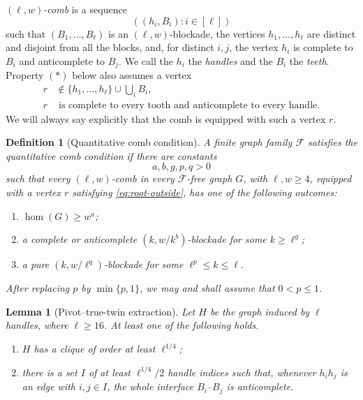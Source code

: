 \documentclass[10pt,a4paper]{amsart}
\newtheorem{definition}{Definition}
\newtheorem{lemma}{Lemma}
\begin{document}
\emph{$(\ell,w)$-comb} is a sequence
\[
                     ((h_i,B_i):i\in[\ell])
\]
such that $(B_1,\ldots,B_\ell)$ is an $(\ell,w)$-blockade, the
vertices $h_1,\ldots,h_\ell$ are distinct and disjoint from all the
blocks, and, for distinct $i,j$, the vertex $h_i$ is complete to
$B_i$ and anticomplete to $B_j$.  We call the $h_i$ the
\emph{handles} and the $B_i$ the \emph{teeth}.  Property $(*)$ below
also assumes a vertex
\begin{equation}
 \begin{split}
 r&\notin\{h_1,\ldots,h_\ell\}\cup\bigcup_iB_i,\\
 r&\text{ is complete to every tooth and anticomplete to every handle.}
 \end{split}
 \label{eq:root-outside}
\end{equation}
We will always say explicitly that the comb is equipped with such a
vertex $r$.

\begin{definition}[Quantitative comb condition]
\label{def:comb-hypothesis}
A finite graph family $\mathcal F$ satisfies the
\emph{quantitative comb condition} if there are constants
\[
                       a,b,g,p,q>0
\]
such that every $(\ell,w)$-comb in every
$\overline{\mathcal F}$-free graph $G$, with $\ell,w\geq4$, equipped with
a vertex $r$ satisfying \eqref{eq:root-outside}, has one of the
following outcomes:
\begin{enumerate}
\item[(H)] $\operatorname{hom}(G)\geq w^a$;
\item[(U)] a complete or anticomplete $(k,w/k^b)$-blockade for some
           $k\geq\ell^g$;
\item[(P)] a pure $(k,w/\ell^q)$-blockade for some
           $\ell^p\leq k\leq\ell$.
\end{enumerate}
After replacing $p$ by $\min\{p,1\}$, we may and shall assume that
$0<p\leq1$.
\end{definition}

\begin{lemma}[Pivot--true-twin extraction]
\label{lem:pivot-twin-extraction}
Let $H$ be the graph induced by $\ell$ handles, where $\ell\geq16$.
At least one of the following holds.
\begin{enumerate}
 \item $H$ has a clique of order at least $\ell^{1/4}$;
 \item there is a set $I$ of at least $\ell^{1/4}/2$ handle indices
       such that, whenever $h_ih_j$ is an edge with $i,j\in I$, the
       whole interface $B_i$--$B_j$ is anticomplete.
\end{enumerate}
\end{lemma}
\end{document}
